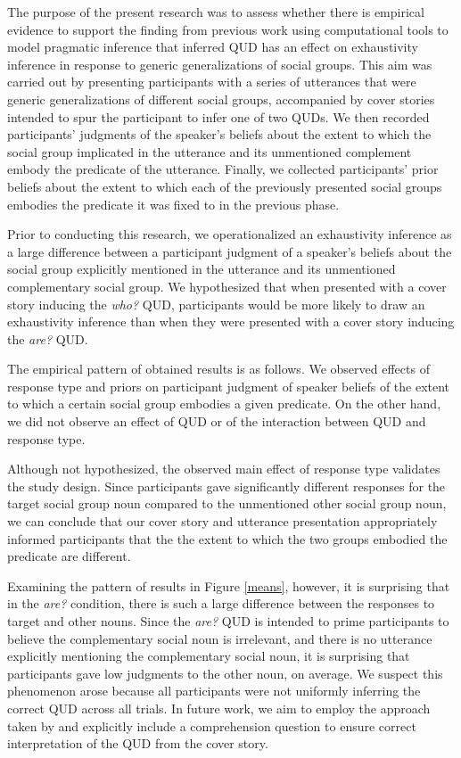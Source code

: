 \documentclass[11pt,a4paper]{article}
\begin{document}
The purpose of the present research was to assess whether there is empirical evidence to support the finding from previous work using computational tools to model pragmatic inference that inferred QUD has an effect on exhaustivity inference in response to generic generalizations of social groups. This aim was carried out by presenting participants with a series of utterances that were generic generalizations of different social groups, accompanied by cover stories intended to spur the participant to infer one of two QUDs. We then recorded participants' judgments of the speaker's beliefs about the extent to which the social group implicated in the utterance and its unmentioned complement embody the predicate of the utterance. Finally, we collected participants' prior beliefs about the extent to which each of the previously presented social groups embodies the predicate it was fixed to in the previous phase. 

Prior to conducting this research, we operationalized an exhaustivity inference as a large difference between a participant judgment of a speaker's beliefs about the social group explicitly mentioned in the utterance and its unmentioned complementary social group. We hypothesized that when presented with a cover story inducing the \textit{who?} QUD, participants would be more likely to draw an exhaustivity inference than when they were presented with a cover story inducing the \textit{are?} QUD. 

The empirical pattern of obtained results is as follows. We observed effects of response type and priors on participant judgment of speaker beliefs of the extent to which a certain social group embodies a given predicate. On the other hand, we did not observe an effect of QUD or of the interaction between QUD and response type. 

Although not hypothesized, the observed main effect of response type validates the study design. Since participants gave significantly different responses for the target social group noun compared to the unmentioned other social group noun, we can conclude that our cover story and utterance presentation appropriately informed participants that the the extent to which the two groups embodied the predicate are different. 

Examining the pattern of results in Figure \ref{means}, however, it is surprising that in the \textit{are?} condition, there is such a large difference between the responses to target and other nouns. Since the \textit{are?} QUD is intended to prime participants to believe the complementary social noun is irrelevant, and there is no utterance explicitly mentioning the complementary social noun, it is surprising that participants gave low judgments to the other noun, on average. We suspect this phenomenon arose because all participants were not uniformly inferring the correct QUD across all trials. In future work, we aim to employ the approach taken by \citet{degen-goodman-2014} and explicitly include a comprehension question to ensure correct interpretation of the QUD from the cover story. 
\end{document}
